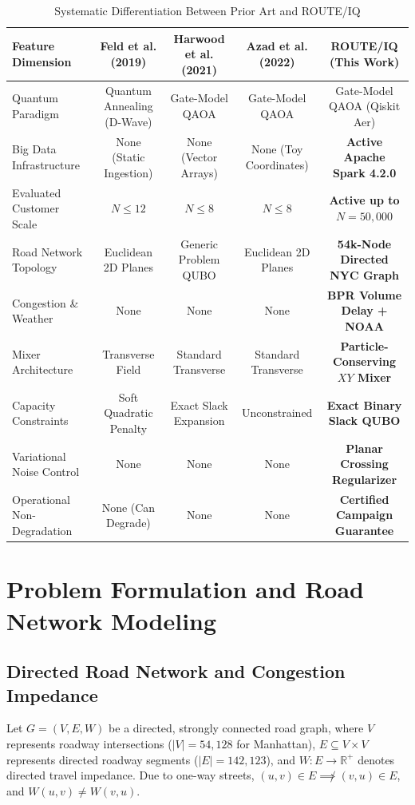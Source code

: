 \documentclass[journal,10pt]{IEEEtran}
\begin{document}
\begin{table}[t]
\caption{Systematic Differentiation Between Prior Art and ROUTE/IQ}
\label{tab:prior_art}
\centering
\begin{tabular}{lcccc}
\toprule
\textbf{Feature Dimension} & \textbf{Feld et al. (2019) \cite{feld2019hybrid}} & \textbf{Harwood et al. (2021) \cite{harwood2021formulating}} & \textbf{Azad et al. (2022) \cite{azad2022solving}} & \textbf{ROUTE/IQ (This Work)} \\
\midrule
Quantum Paradigm & Quantum Annealing (D-Wave) & Gate-Model QAOA & Gate-Model QAOA & Gate-Model QAOA (Qiskit Aer) \\
Big Data Infrastructure & None (Static Ingestion) & None (Vector Arrays) & None (Toy Coordinates) & \textbf{Active Apache Spark 4.2.0} \\
Evaluated Customer Scale & $N \le 12$ & $N \le 8$ & $N \le 8$ & \textbf{Active up to $N = 50,000$} \\
Road Network Topology & Euclidean 2D Planes & Generic Problem QUBO & Euclidean 2D Planes & \textbf{54k-Node Directed NYC Graph} \\
Congestion \& Weather & None & None & None & \textbf{BPR Volume Delay + NOAA} \\
Mixer Architecture & Transverse Field & Standard Transverse & Standard Transverse & \textbf{Particle-Conserving $XY$ Mixer} \\
Capacity Constraints & Soft Quadratic Penalty & Exact Slack Expansion & Unconstrained & \textbf{Exact Binary Slack QUBO} \\
Variational Noise Control & None & None & None & \textbf{Planar Crossing Regularizer} \\
Operational Non-Degradation & None (Can Degrade) & None & None & \textbf{Certified Campaign Guarantee} \\
\bottomrule
\end{tabular}
\end{table}

\section{Problem Formulation and Road Network Modeling}
\subsection{Directed Road Network and Congestion Impedance}
Let $G = (V, E, W)$ be a directed, strongly connected road graph, where $V$ represents roadway intersections ($|V| = 54,128$ for Manhattan), $E \subseteq V \times V$ represents directed roadway segments ($|E| = 142,123$), and $W: E \to \mathbb{R}^+$ denotes directed travel impedance. Due to one-way streets, $(u, v) \in E \not\implies (v, u) \in E$, and $W(u, v) \ne W(v, u)$.
\end{document}
